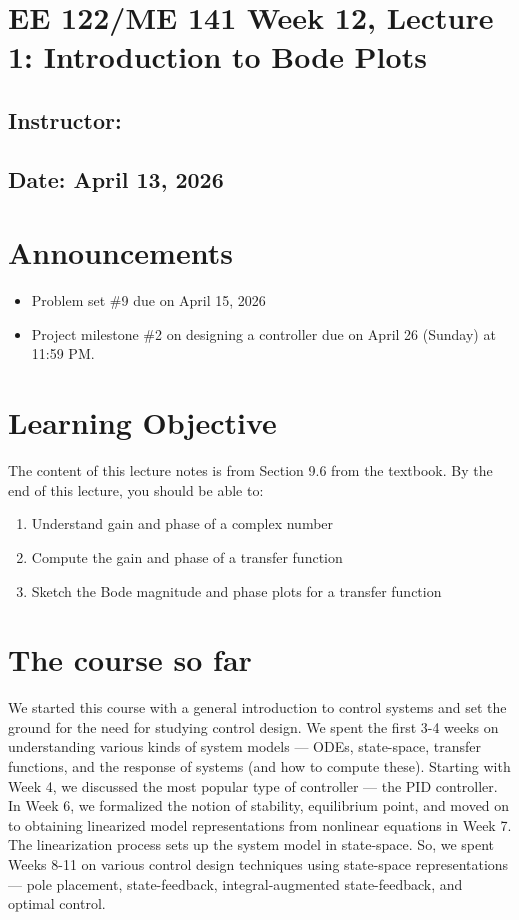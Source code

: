\documentclass{ee122_notes}
\renewcommand{\releasedate}{April 13, 2026}
\begin{document}
\section*{EE 122/ME 141 Week 12, Lecture 1: Introduction to Bode Plots}
\subsection*{Instructor: \instructor}
\subsection*{Date: \releasedate}
\section{Announcements}
\begin{itemize}
    \item Problem set \#9 due on April 15, 2026 
    \item Project milestone \#2 on designing a controller due on April 26 (Sunday) at 11:59 PM.
\end{itemize}
\section{Learning Objective}
The content of this lecture notes is from Section 9.6 from the textbook. By the end of this lecture, you should be able to:
\begin{enumerate}
    \item Understand gain and phase of a complex number
    \item Compute the gain and phase of a transfer function
    \item Sketch the Bode magnitude and phase plots for a transfer function
\end{enumerate}
\section{The course so far}
We started this course with a general introduction to control systems and set the ground for the need for studying control design. We spent the first 3-4 weeks on understanding various kinds of system models --- ODEs, state-space, transfer functions, and the response of systems (and how to compute these). Starting with Week 4, we discussed the most popular type of controller --- the PID controller. In Week 6, we formalized the notion of stability, equilibrium point, and moved on to obtaining linearized model representations from nonlinear equations in Week 7. The linearization process sets up the system model in state-space. So, we spent Weeks 8-11 on various control design techniques using state-space representations --- pole placement, state-feedback, integral-augmented state-feedback, and optimal control. 
\end{document}
